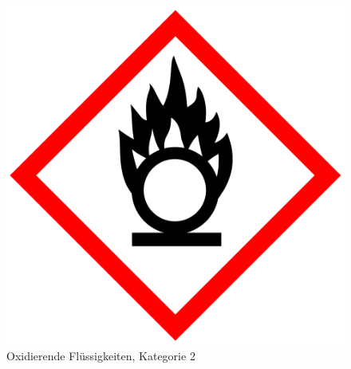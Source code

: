 \begin{figure}[h]
    \begin{center}
        \begin{minipage}[t]{0.4\textwidth}
            \begin{center}
                \includegraphics[height=0.1\textheight]{Bilder/Optische_Datentraeger_Die_Compact_Disc/Material_Polycarbonat/cdbrandfoerdernd.png}
                \caption[Oxidierende Flüssigkeiten, Kategorie 2 \newline \url{https://upload.wikimedia.org/wikipedia/commons/e/e5/GHS-pictogram-rondflam.svg}]{Oxidierende Flüssigkeiten, Kategorie 2}
                \label{fig:cdbrandfoerdernd}
            \end{center}
        \end{minipage}
        \hspace{0.025\textwidth}
        \begin{minipage}[t]{0.4\textwidth}
            \begin{center}

\end{center}
\end{minipage}
\end{center}
\end{figure}
